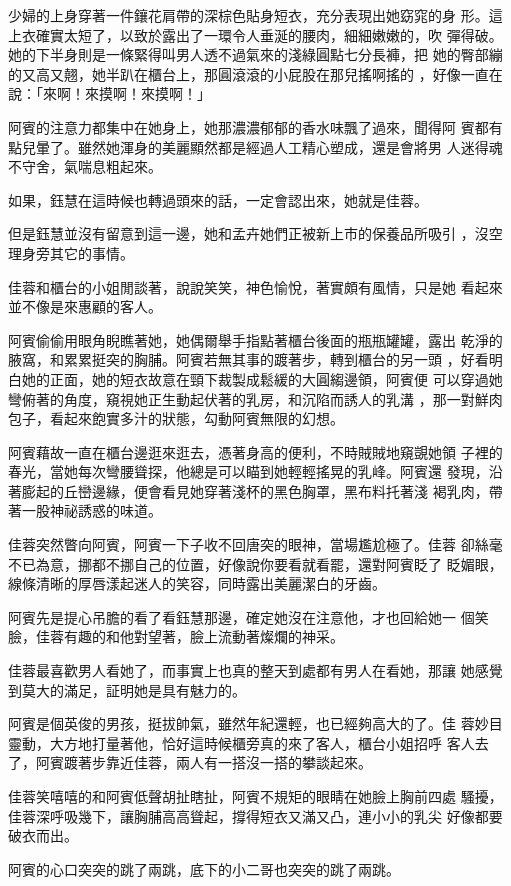 少婦的上身穿著一件鑲花肩帶的深棕色貼身短衣，充分表現出她窈窕的身
形。這上衣確實太短了，以致於露出了一環令人垂涎的腰肉，細細嫩嫩的，吹
彈得破。她的下半身則是一條緊得叫男人透不過氣來的淺綠圓點七分長褲，把
她的臀部繃的又高又翹，她半趴在櫃台上，那圓滾滾的小屁股在那兒搖啊搖的
，好像一直在說：「來啊！來摸啊！來摸啊！」

阿賓的注意力都集中在她身上，她那濃濃郁郁的香水味飄了過來，聞得阿
賓都有點兒暈了。雖然她渾身的美麗顯然都是經過人工精心塑成，還是會將男
人迷得魂不守舍，氣喘息粗起來。

如果，鈺慧在這時候也轉過頭來的話，一定會認出來，她就是佳蓉。

但是鈺慧並沒有留意到這一邊，她和孟卉她們正被新上市的保養品所吸引
，沒空理身旁其它的事情。

佳蓉和櫃台的小姐閒談著，說說笑笑，神色愉悅，著實頗有風情，只是她
看起來並不像是來惠顧的客人。

阿賓偷偷用眼角睨瞧著她，她偶爾舉手指點著櫃台後面的瓶瓶罐罐，露出
乾淨的腋窩，和累累挺突的胸脯。阿賓若無其事的踱著步，轉到櫃台的另一頭
，好看明白她的正面，她的短衣故意在頸下裁製成鬆緩的大圓縐邊領，阿賓便
可以穿過她彎俯著的角度，窺視她正生動起伏著的乳房，和沉陷而誘人的乳溝
，那一對鮮肉包子，看起來飽實多汁的狀態，勾動阿賓無限的幻想。

阿賓藉故一直在櫃台邊逛來逛去，憑著身高的便利，不時賊賊地窺覬她領
子裡的春光，當她每次彎腰聳探，他總是可以瞄到她輕輕搖晃的乳峰。阿賓還
發現，沿著膨起的丘巒邊緣，便會看見她穿著淺杯的黑色胸罩，黑布料托著淺
褐乳肉，帶著一股神祕誘惑的味道。

佳蓉突然瞥向阿賓，阿賓一下子收不回唐突的眼神，當場尷尬極了。佳蓉
卻絲毫不已為意，挪都不挪自己的位置，好像說你要看就看罷，還對阿賓眨了
眨媚眼，線條清晰的厚唇漾起迷人的笑容，同時露出美麗潔白的牙齒。

阿賓先是提心吊膽的看了看鈺慧那邊，確定她沒在注意他，才也回給她一
個笑臉，佳蓉有趣的和他對望著，臉上流動著燦爛的神采。

佳蓉最喜歡男人看她了，而事實上也真的整天到處都有男人在看她，那讓
她感覺到莫大的滿足，証明她是具有魅力的。

阿賓是個英俊的男孩，挺拔帥氣，雖然年紀還輕，也已經夠高大的了。佳
蓉妙目靈動，大方地打量著他，恰好這時候櫃旁真的來了客人，櫃台小姐招呼
客人去了，阿賓踱著步靠近佳蓉，兩人有一搭沒一搭的攀談起來。

佳蓉笑嘻嘻的和阿賓低聲胡扯瞎扯，阿賓不規矩的眼睛在她臉上胸前四處
騷擾，佳蓉深呼吸幾下，讓胸脯高高聳起，撐得短衣又滿又凸，連小小的乳尖
好像都要破衣而出。

阿賓的心口突突的跳了兩跳，底下的小二哥也突突的跳了兩跳。

